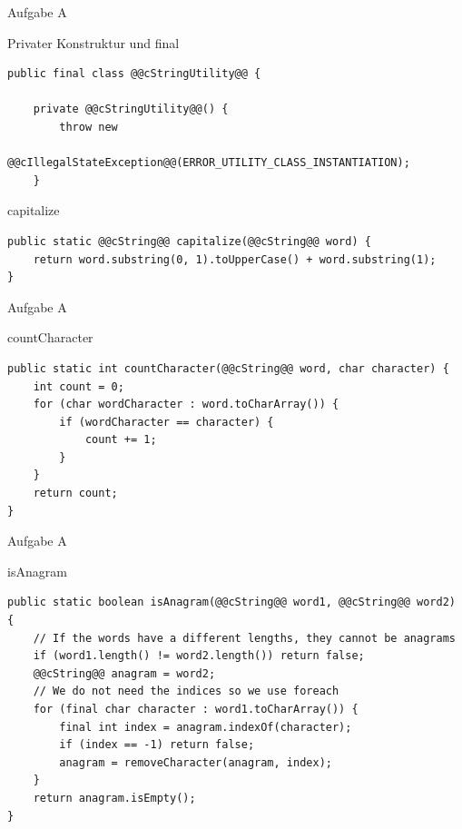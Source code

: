 \documentclass[aspectratio=169]{beamer}
\begin{document}
\begin{frame}[fragile]{Aufgabe A}
  \begin{alertblock}{Privater Konstruktur und \color{keywordcolor}final}
    \begin{lstlisting}
public final class @@cStringUtility@@ {

    private @@cStringUtility@@() {
        throw new
            @@cIllegalStateException@@(ERROR_UTILITY_CLASS_INSTANTIATION);
    }
    \end{lstlisting}
  \end{alertblock}
  \pause
  \begin{block}{capitalize}
    \begin{lstlisting}
public static @@cString@@ capitalize(@@cString@@ word) {
    return word.substring(0, 1).toUpperCase() + word.substring(1);
}
    \end{lstlisting}
  \end{block}
\end{frame}

\begin{frame}[fragile]{Aufgabe A}
  \begin{block}{countCharacter}
    \begin{lstlisting}
public static int countCharacter(@@cString@@ word, char character) {
    int count = 0;
    for (char wordCharacter : word.toCharArray()) {
        if (wordCharacter == character) {
            count += 1;
        }
    }
    return count;
}
    \end{lstlisting}
  \end{block}
\end{frame}

\begin{frame}[fragile]{Aufgabe A}
  \begin{block}{isAnagram}
    \begin{lstlisting}
public static boolean isAnagram(@@cString@@ word1, @@cString@@ word2) {
    // If the words have a different lengths, they cannot be anagrams
    if (word1.length() != word2.length()) return false;
    @@cString@@ anagram = word2;
    // We do not need the indices so we use foreach
    for (final char character : word1.toCharArray()) {
        final int index = anagram.indexOf(character);
        if (index == -1) return false;
        anagram = removeCharacter(anagram, index);
    }
    return anagram.isEmpty();
}
    \end{lstlisting}
  \end{block}
\end{frame}
\end{document}
